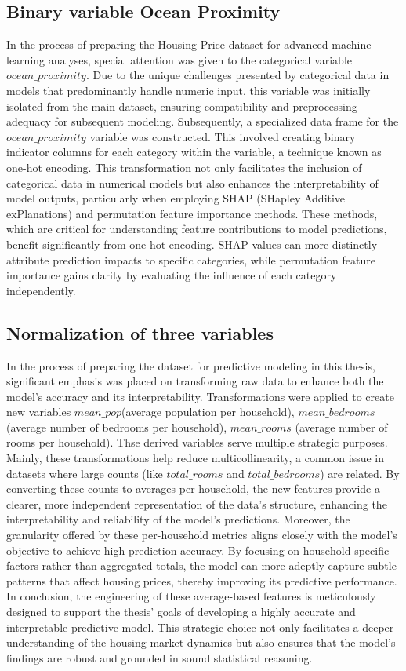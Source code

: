 \documentclass[12pt]{article}
\begin{document}
\subsection{Binary variable Ocean Proximity}
In the process of preparing the Housing Price dataset for advanced machine learning analyses, special attention was given to the categorical variable $ocean\_proximity$.  Due to the unique challenges presented by categorical data in models that predominantly handle numeric input, this variable was initially isolated from the main dataset, ensuring compatibility and preprocessing adequacy for subsequent modeling. 
Subsequently, a specialized data frame for the  $ocean\_proximity$ variable was constructed. This involved creating binary indicator columns for each category within the variable, a technique known as one-hot encoding.  This transformation not only facilitates the inclusion of categorical data in numerical models but also enhances the interpretability of model outputs, particularly when employing SHAP (SHapley Additive exPlanations) and permutation feature importance methods.
These methods, which are critical for understanding feature contributions to model predictions, benefit significantly from one-hot encoding. SHAP values can more distinctly attribute prediction impacts to specific categories, while permutation feature importance gains clarity by evaluating the influence of each category independently.

\subsection{Normalization of three variables}
In the process of preparing the dataset for predictive modeling in this thesis, significant emphasis was placed on transforming raw data to enhance both the model's accuracy and its interpretability. Transformations were applied to create new variables $mean\_pop$(average population per household), $mean\_bedrooms$ (average number of bedrooms per household), $mean\_rooms$ (average number of rooms per household). Thse derived variables serve multiple strategic purposes. Mainly, these transformations help reduce multicollinearity, a common issue in datasets where large counts (like $total\_rooms$ and $total\_bedrooms$) are related. By converting these counts to averages per household, the new features provide a clearer, more independent representation of the data's structure, enhancing the interpretability and reliability of the model's predictions. Moreover, the granularity offered by these per-household metrics aligns closely with the model's objective to achieve high prediction accuracy. By focusing on household-specific factors rather than aggregated totals, the model can more adeptly capture subtle patterns that affect housing prices, thereby improving its predictive performance.
In conclusion, the engineering of these average-based features is meticulously designed to support the thesis' goals of developing a highly accurate and interpretable predictive model. This strategic choice not only facilitates a deeper understanding of the housing market dynamics but also ensures that the model's findings are robust and grounded in sound statistical reasoning.
\end{document}
